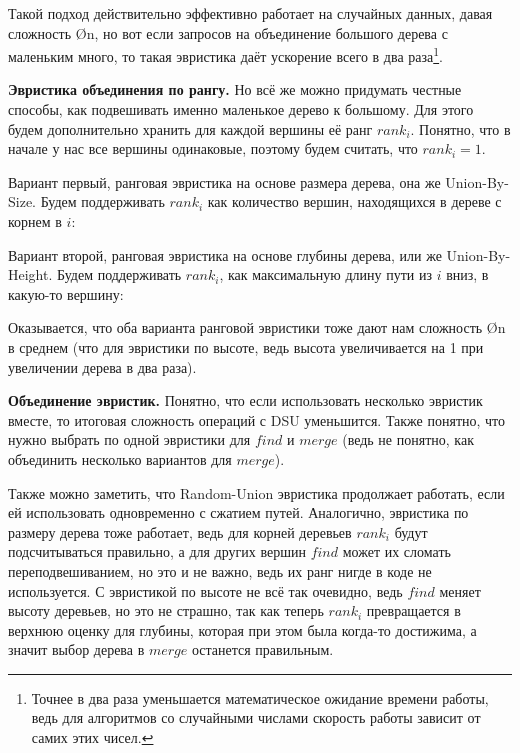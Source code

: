 \nocode

Такой подход действительно эффективно работает на случайных данных, давая сложность \O{\log n}, но вот если запросов на объединение большого дерева с маленьким много, то такая эвристика даёт ускорение всего в два раза\footnote{Точнее в два раза уменьшается математическое ожидание времени работы, ведь для алгоритмов со случайными числами скорость работы зависит от самих этих чисел.}.

\textbf{Эвристика объединения по рангу.} Но всё же можно придумать честные способы, как подвешивать именно маленькое дерево к большому. Для этого будем дополнительно хранить для каждой вершины её ранг $rank_i$. Понятно, что в начале у нас все вершины одинаковые, поэтому будем считать, что $rank_i = 1$.

Вариант первый, ранговая эвристика на основе размера дерева, она же Union-By-Size. Будем поддерживать $rank_i$ как количество вершин, находящихся в дереве с корнем в $i$:

\nocode

Вариант второй, ранговая эвристика на основе глубины дерева, или же Union-By-Height. Будем поддерживать $rank_i$, как максимальную длину пути из $i$ вниз, в какую-то вершину:

\nocode

Оказывается, что оба варианта ранговой эвристики тоже дают нам сложность \O{\log n} в среднем (что для эвристики по высоте, ведь высота увеличивается на 1 при увеличении дерева в два раза).

\textbf{Объединение эвристик.} Понятно, что если использовать несколько эвристик вместе, то итоговая сложность операций с DSU уменьшится. Также понятно, что нужно выбрать по одной эвристики для $find$ и $merge$ (ведь не понятно, как объединить несколько вариантов для $merge$).

Также можно заметить, что Random-Union эвристика продолжает работать, если ей использовать одновременно с сжатием путей. Аналогично, эвристика по размеру дерева тоже работает, ведь для корней деревьев $rank_i$ будут подсчитываться правильно, а для других вершин $find$ может их сломать переподвешиванием, но это и не важно, ведь их ранг нигде в коде не используется. С эвристикой по высоте не всё так очевидно, ведь $find$ меняет высоту деревьев, но это не страшно, так как теперь $rank_i$ превращается в верхнюю оценку для глубины, которая при этом была когда-то достижима, а значит выбор дерева в $merge$ останется правильным.

